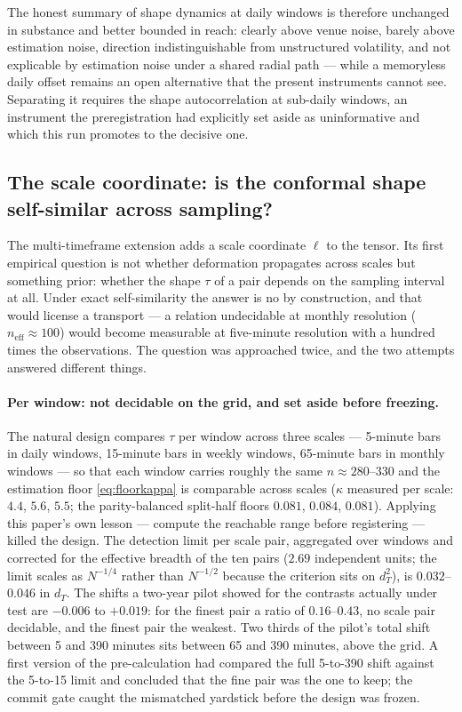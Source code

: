 \documentclass[11pt,a4paper]{article}
\numberwithin{equation}{section}
\begin{document}
The honest summary of shape dynamics at daily windows is therefore
unchanged in substance and better bounded in reach: clearly above
venue noise, barely above estimation noise, direction
indistinguishable from unstructured volatility, and not explicable
by estimation noise under a shared radial path --- while a
memoryless daily offset remains an open alternative that the
present instruments cannot see. Separating it requires the shape
autocorrelation at sub-daily windows, an instrument the
preregistration had explicitly set aside as uninformative and
which this run promotes to the decisive one.

\subsection{The scale coordinate: is the conformal shape
self-similar across sampling?}
\label{sec:scalecoord}

The multi-timeframe extension adds a scale coordinate $\ell$ to the
tensor. Its first empirical question is not whether deformation
propagates across scales but something prior: whether the shape
$\tau$ of a pair depends on the sampling interval at all. Under
exact self-similarity the answer is no by construction, and that
would license a transport --- a relation undecidable at monthly
resolution ($n_{\mathrm{eff}}\approx100$) would become measurable
at five-minute resolution with a hundred times the observations.
The question was approached twice, and the two attempts answered
different things.

\paragraph{Per window: not decidable on the grid, and set aside
before freezing.} The natural design compares $\tau$ per window
across three scales --- 5-minute bars in daily windows, 15-minute
bars in weekly windows, 65-minute bars in monthly windows --- so
that each window carries roughly the same $n\approx280$--$330$
and the estimation floor \eqref{eq:floorkappa} is comparable
across scales ($\kappa$ measured per scale: $4.4$, $5.6$, $5.5$;
the parity-balanced split-half floors $0.081$, $0.084$, $0.081$).
Applying this paper's own lesson --- compute the reachable range
before registering --- killed the design. The detection limit per
scale pair, aggregated over windows and corrected for the
effective breadth of the ten pairs ($2.69$ independent units; the
limit scales as $N^{-1/4}$ rather than $N^{-1/2}$ because the
criterion sits on $d_T^2$), is $0.032$--$0.046$ in $d_T$. The
shifts a two-year pilot showed for the contrasts actually under
test are $-0.006$ to $+0.019$: for the finest pair a ratio of $0.16$--$0.43$, no scale pair
decidable, and the finest pair the weakest. Two thirds of the
pilot's total shift between 5 and 390 minutes sits between 65 and
390 minutes, above the grid. A first version of the pre-calculation
had compared the full 5-to-390 shift against the 5-to-15 limit and
concluded that the fine pair was the one to keep; the commit gate
caught the mismatched yardstick before the design was frozen.
\end{document}
